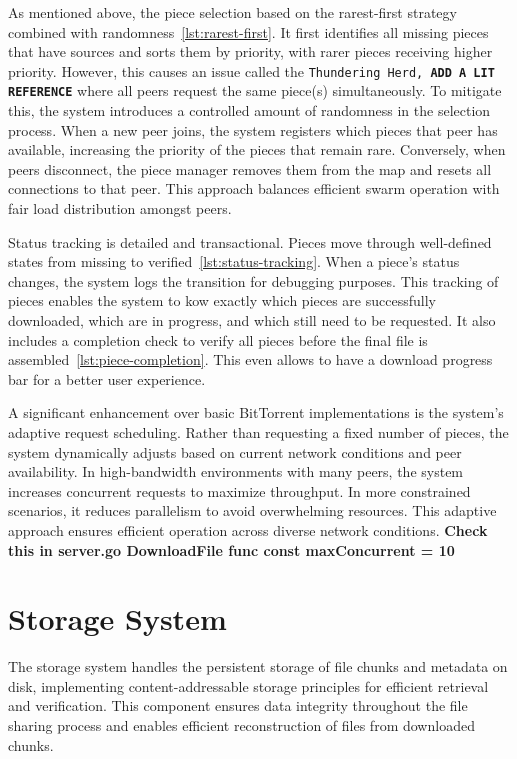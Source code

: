 \documentclass[12pt,a4paper]{report}
\begin{document}
As mentioned above, the piece selection based on the rarest-first strategy combined with randomness~\ref{lst:rarest-first}. It first identifies all missing pieces that have sources and sorts them by priority, with rarer pieces receiving higher priority. However, this causes an issue called the \texttt{Thundering Herd, \textbf{ADD A LIT REFERENCE}} where all peers request the same piece(s) simultaneously. To mitigate this, the system introduces a controlled amount of randomness in the selection process. When a new peer joins, the system registers which pieces that peer has available, increasing the priority of the pieces that remain rare. Conversely, when peers disconnect, the piece manager removes them from the map and resets all connections to that peer. This approach balances efficient swarm operation with fair load distribution amongst peers.

Status tracking is detailed and transactional. Pieces move through well-defined states from missing to verified~\ref{lst:status-tracking}. When a piece's status changes, the system logs the transition for debugging purposes. This tracking of pieces enables the system to kow exactly which pieces are successfully downloaded, which are in progress, and which still need to be requested. It also includes a completion check to verify all pieces before the final file is assembled~\ref{lst:piece-completion}. This even allows to have a download progress bar for a better user experience.

A significant enhancement over basic BitTorrent implementations is the system's adaptive request scheduling. Rather than requesting a fixed number of pieces, the system dynamically adjusts based on current network conditions and peer availability. In high-bandwidth environments with many peers, the system increases concurrent requests to maximize throughput. In more constrained scenarios, it reduces parallelism to avoid overwhelming resources. This adaptive approach ensures efficient operation across diverse network conditions. \textbf{Check this in server.go DownloadFile func 	const maxConcurrent = 10}

\section{Storage System}
The storage system handles the persistent storage of file chunks and metadata on disk, implementing content-addressable storage principles for efficient retrieval and verification. This component ensures data integrity throughout the file sharing process and enables efficient reconstruction of files from downloaded chunks.
\end{document}
